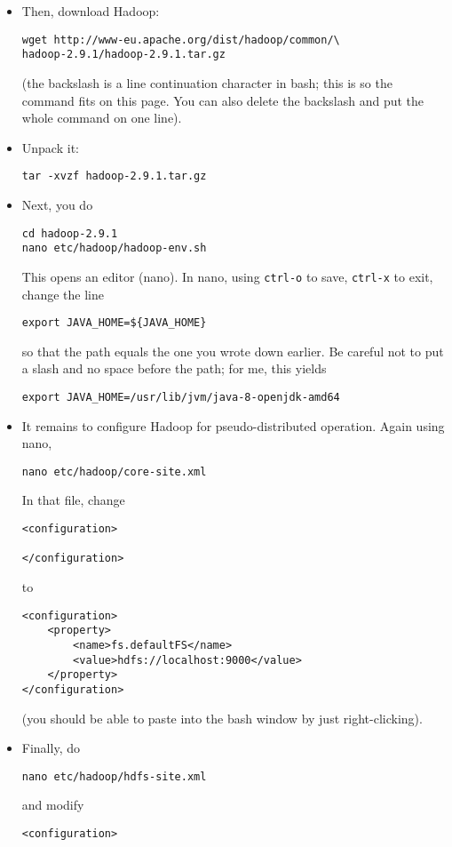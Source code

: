\documentclass[11pt,a4paper]{article}
\begin{document}
\begin{itemize}
\item Then, download Hadoop:
\begin{verbatim}
wget http://www-eu.apache.org/dist/hadoop/common/\
hadoop-2.9.1/hadoop-2.9.1.tar.gz
\end{verbatim}
(the backslash is a line continuation character in bash; this is so the command fits on this page. You can also delete the backslash and put the whole command on one line).
\item Unpack it:
\begin{verbatim}
tar -xvzf hadoop-2.9.1.tar.gz
\end{verbatim}
\item Next, you do
\begin{verbatim}
cd hadoop-2.9.1
nano etc/hadoop/hadoop-env.sh
\end{verbatim}
This opens an editor (nano). In nano, using  \verb+ctrl-o+ to save, \verb+ctrl-x+ to exit, change the line
\begin{verbatim}
export JAVA_HOME=${JAVA_HOME}
\end{verbatim}
so that the path equals the one you wrote down earlier. Be careful not to put a slash and no space before the path; for me, this yields
\begin{verbatim}
export JAVA_HOME=/usr/lib/jvm/java-8-openjdk-amd64
\end{verbatim}

\item It remains to configure Hadoop for pseudo-distributed operation. Again using nano,
\begin{verbatim}
nano etc/hadoop/core-site.xml
\end{verbatim}
In that file, change

\begin{verbatim}
<configuration>

</configuration>
\end{verbatim}
to
\begin{verbatim}
<configuration>
    <property>
        <name>fs.defaultFS</name>
        <value>hdfs://localhost:9000</value>
    </property>
</configuration>
\end{verbatim}
(you should be able to paste into the bash window by just right-clicking).
\item Finally, do
\begin{verbatim}
nano etc/hadoop/hdfs-site.xml
\end{verbatim}
and modify
\begin{verbatim}
<configuration>


\end{verbatim}
\end{itemize}
\end{document}
